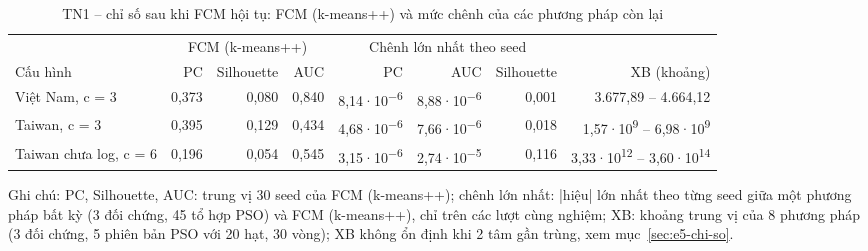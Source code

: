 \begin{table}[htbp]
\centering
\caption{TN1 -- chỉ số sau khi FCM hội tụ: FCM (k-means++) và mức chênh của các phương pháp còn lại}
\label{tab:e5-chi-so}
\footnotesize
\setlength{\tabcolsep}{3pt}
\begin{tabular}{@{}lrrrrrrr@{}}
\toprule
& \multicolumn{3}{c}{FCM (k-means++)} & \multicolumn{3}{c}{Chênh lớn nhất theo seed} & \\
\cmidrule(lr){2-4} \cmidrule(lr){5-7}
Cấu hình & PC & Silhouette & AUC & PC & AUC & Silhouette & XB (khoảng) \\
\midrule
Việt Nam, c = 3 & 0,373 & 0,080 & 0,840 & 8,14·10\textsuperscript{−6} & 8,88·10\textsuperscript{−6} & 0,001 & 3.677,89 -- 4.664,12 \\
Taiwan, c = 3 & 0,395 & 0,129 & 0,434 & 4,68·10\textsuperscript{−6} & 7,66·10\textsuperscript{−6} & 0,018 & 1,57·10\textsuperscript{9} -- 6,98·10\textsuperscript{9} \\
Taiwan chưa log, c = 6 & 0,196 & 0,054 & 0,545 & 3,15·10\textsuperscript{−6} & 2,74·10\textsuperscript{−5} & 0,116 & 3,33·10\textsuperscript{12} -- 3,60·10\textsuperscript{14} \\
\bottomrule
\end{tabular}
\par\smallskip\parbox{\linewidth}{\scriptsize Ghi chú: PC, Silhouette, AUC: trung vị 30 seed của FCM (k-means++); chênh lớn nhất: |hiệu| lớn nhất theo từng seed giữa một phương pháp bất kỳ (3 đối chứng, 45 tổ hợp PSO) và FCM (k-means++), chỉ trên các lượt cùng nghiệm; XB: khoảng trung vị của 8 phương pháp (3 đối chứng, 5 phiên bản PSO với 20 hạt, 30 vòng); XB không ổn định khi 2 tâm gần trùng, xem mục~\ref{sec:e5-chi-so}.}
\end{table}

